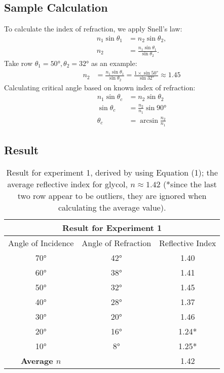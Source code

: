 \documentclass{elegantpaper}
\begin{document}
\subsection{Sample Calculation}
To calculate the index of refraction, we apply Snell's law:
\begin{align}
    n_1\sin{\theta_1}&=n_2\sin{\theta_2} \label{snells_law}\tag{Snell's Law}, \\
    n_2&=\frac{n_1\sin{\theta_1}}{
        \sin{\theta_2}
    }.
\end{align}
Take row $\theta_1=\ang{50}, \theta_2=\ang{32}$ as an example:
\begin{align*}
    n_2&=\frac{n_1\sin{\theta_1}}{\sin{\theta_2}}=\frac{1\times\sin{\ang{50}}}{\sin{\ang{32}}}\approx1.45
\end{align*}
Calculating critical angle based on known index of refraction:
\begin{align*}
  n_1\sin{\theta_c}&=n_2\sin{\theta_2} \label{snells_law}\tag{Snell's Law} \\
  \sin \theta_{c}&=\frac{n_{2}}{n_{1}} \sin{\ang{90}}\\
  \theta_{c}&=\arcsin{\frac{n_{2}}{n_{1}}} \label{Critical Angle Equation} \tag{Critical Angle Equation}
\end{align*}
\clearpage
\subsection{Result}
\begin{table}[!ht]\footnotesize
	\centering
    \begin{tabular}{c|c|c}
        \multicolumn{3}{c}{\textbf{Result for Experiment 1}}\\ \hline
        Angle of Incidence & Angle of Refraction & Reflective Index \\ \hline
        \ang{70}&\ang{42}&1.40\\
        \ang{60}&\ang{38}&1.41\\
        \ang{50}&\ang{32}&1.45\\
        \ang{40}&\ang{28}&1.37\\
        \ang{30}&\ang{20}&1.46\\
        \ang{20}&\ang{16}&1.24*\\
        \ang{10}&\ang{8}&1.25*\\
        \hline
        \multicolumn{1}{c}{\textbf{Average $n$}} & \multicolumn{1}{c}{} & 1.42\\
        \hline
        \end{tabular}

  \caption{Result for experiment 1, derived by using Equation (1); the average reflective index for glycol, $n\approx1.42$ (*since the last two row appear to be outliers, they are ignored when calculating the average value).}
	\label{table: index of refraction}
\end{table}
\end{document}
